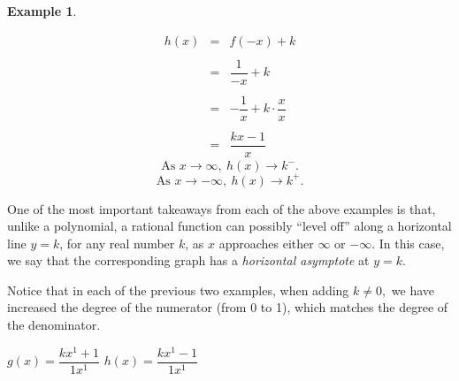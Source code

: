 \documentclass[12pt]{book}
\theoremstyle{definition}
\newtheorem{example}{Example}
\begin{document}
\begin{example}
\begin{multicols}{2}
\begin{eqnarray*}
 h(x) & = & f(-x)+k\\
&&\\
      & = & \dfrac{1}{-x}+k\\
&&\\
      & = & -\dfrac{1}{x}+k\cdot\dfrac{x}{x}\\
&&\\
      & = & \dfrac{kx-1}{x}
\end{eqnarray*}
$$\text{As } x\rightarrow\infty,\ h(x)\rightarrow k^-.$$
$$\text{As } x\rightarrow-\infty,\ h(x)\rightarrow k^+.$$

\columnbreak

\end{multicols}
\end{example}
One of the most important takeaways from each of the above examples is that, unlike a polynomial, a rational function can possibly ``level off'' along a horizontal line $y=k$, for any real number $k$, as $x$ approaches either $\infty$ or $-\infty$.  In this case, we say that the corresponding graph has a \textit{horizontal asymptote} at $y=k$.\par
Notice that in each of the previous two examples, when adding $k\neq 0,$ we have increased the degree of the numerator (from 0 to 1), which matches the degree of the denominator.
\begin{center}
$g(x)=\dfrac{kx^1+1}{1x^1}$
\hspace{1in}
$h(x)=\dfrac{kx^1-1}{1x^1}$
\end{center}
\end{document}
